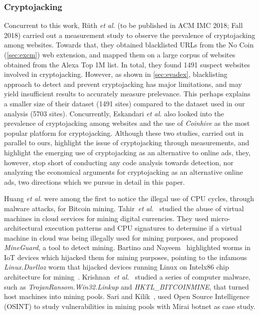 \documentclass[acmlarge]{acmart}
\newcommand{\ch}{{\em Coinhive}\xspace}
\newcommand{\cj}{cryptojacking\xspace}
\newcommand{\etal}{{\em et al.}\xspace}
\begin{document}
\subsubsection*{Cryptojacking}
Concurrent to this work, R{\"u}th \etal \cite{RuthWH18} (to be published in ACM IMC 2018; Fall 2018) carried out a measurement study to observe the prevalence of \cj among websites. Towards that, they obtained blacklisted URLs from the No Coin (\textsection\ref{sec:excm}) web extension, and mapped them on a large corpus of websites obtained from the Alexa Top 1M list. In total, they found 1491 suspect websites involved in \cj. However, as shown in \textsection\ref{sec:evadex}, blacklisting approach to detect and prevent \cj has major limitations, and may yield insufficient results to accurately measure prelevance. This perhaps explains a smaller size of their dataset (1491 sites) compared to the dataset used in our analysis (5703 sites). Concurrently, Eskandari \etal \cite{EskandariLMC18} also looked into the prevalence of \cj among websites and the use of \ch as the most popular platform for \cj. Although these two studies, carried out in parallel to ours, highlight the issue of \cj  through measurements, and highlight the emerging use of \cj as an alternative to online ads, they, however, stop short of conducting any code analysis towards detection, nor analyzing the economical arguments for \cj as an alternative online ads, two directions which we pursue in detail in this paper.%


Huang \etal \cite{HuangDMDGMSWSL14}  were among the first to notice the illegal use of CPU cycles, through malware attacks, for Bitcoin mining. Tahir~\etal~\cite{TahirHDAGZCB17} studied the abuse of virtual machines in cloud services for mining digital currencies. They used micro-architectural execution patterns and CPU signatures to determine if a virtual machine in cloud was being illegally used for mining purposes, and proposed \textit{MineGuard}, a tool to detect mining. Bartino and Nayeem~\cite{BertinoN-17} highlighted worms in IoT devices which hijacked them for mining purposes, pointing to the infamous {\em Linux.Darlloz} worm that hijacked devices running Linux on Intelx86 chip architecture for mining~\cite{Bansal-14}. Krishnan~\etal~\cite{KrishnanSV-17} studied a series of computer malware, such as {\em TrojanRansom.Win32.Linkup} and {\em HKTL\_BITCOINMINE}, that turned host machines into mining pools. Sari and Kilik~\cite{SariS-17}, used Open Source Intelligence (OSINT) to study vulnerabilities in mining pools with Mirai botnet as case study. 
\end{document}
